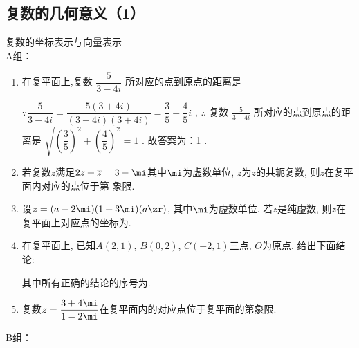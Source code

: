 \subsection{复数的几何意义（1）}
\zsd 复数的坐标表示与向量表示 \\
A组：
\begin{enumerate}
    \item 在复平面上,复数 $ \dfrac{5}{3 - {4i}} $ 所对应的点到原点的距离是
    \begin{jieda}
        $ \because \dfrac{5}{3 - {4i}} = \dfrac{5\left( {3 + {4i}}\right) }{\left( {3 - {4i}}\right) \left( {3 + {4i}}\right) } = \dfrac{3}{5} + \dfrac{4}{5}i $ ,
        $ \therefore $ 复数 $ \frac{5}{3 - {4i}} $ 所对应的点到原点的距离是 $ \sqrt{{\left( \dfrac{3}{5}\right) }^{2} + {\left( \dfrac{4}{5}\right) }^{2}} = 1 $ .
        故答案为：1 .
    \end{jieda} 
    \item 若复数$z$满足$2z+\overline{z}=3-\mi$其中$\mi$为虚数单位, $\overline{z}$为$z$的共轭复数, 则$z$在复平面内对应的点位于第 象限.
    \item 设$z=(a-2\mi)(1+3\mi)(a\zr)$, 其中$\mi$为虚数单位. 若$z$是纯虚数, 则$z$在复平面上对应点的坐标为. 
    \item 在复平面上, 已知$A(2,1)$, $B(0,2)$, $C(-2,1)$三点, $O$为原点. 给出下面结论: 
    其中所有正确的结论的序号为. 
    \item 复数$z=\dfrac{3+4\mi}{1-2\mi}$在复平面内的对应点位于复平面的第象限.
\end{enumerate}
B组：

